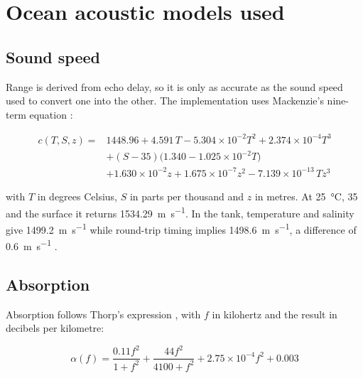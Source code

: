 \documentclass[11pt,a4paper]{article}
\begin{document}
\section{Ocean acoustic models used}

\subsection{Sound speed}

Range is derived from echo delay, so it is only as accurate as the sound speed
used to convert one into the other. The implementation uses Mackenzie's
nine-term equation \cite{mackenzie1981}:

\begin{equation}
\begin{split}
c(T,S,z) ={}& 1448.96 + 4.591\,T - 5.304\times10^{-2}T^{2}
             + 2.374\times10^{-4}T^{3} \\
           & + (S-35)\bigl(1.340 - 1.025\times10^{-2}T\bigr) \\
           & + 1.630\times10^{-2}z + 1.675\times10^{-7}z^{2}
             - 7.139\times10^{-13}\,T z^{3}
\end{split}
\label{eq:mackenzie}
\end{equation}

with $T$ in degrees Celsius, $S$ in parts per thousand and $z$ in metres. At
\SI{25}{\celsius}, \SI{35}{\ppt} and the surface it returns
\SI{1534.29}{\metre\per\second}. In the tank, temperature and salinity give
\SI{1499.2}{\metre\per\second} while round-trip timing implies
\SI{1498.6}{\metre\per\second}, a difference of
\SI{0.6}{\metre\per\second} .

\subsection{Absorption}

Absorption follows Thorp's expression \cite{thorp1967}, with $f$ in kilohertz
and the result in decibels per kilometre:

\begin{equation}
\alpha(f) = \frac{0.11f^{2}}{1+f^{2}} + \frac{44f^{2}}{4100+f^{2}}
          + 2.75\times10^{-4}f^{2} + 0.003
\label{eq:thorp}
\end{equation}
\end{document}
